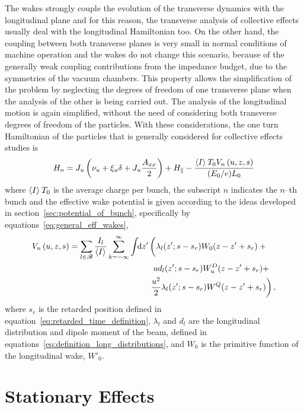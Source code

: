     The wakes strongly couple the evolution of the transverse dynamics with the longitudinal plane and for this reason, the transverse analysis of collective effects usually deal with the longitudinal Hamiltonian too. On the other hand, the coupling between both transverse planes is very small in normal conditions of machine operation and the wakes do not change this scenario, because of the generally weak coupling contributions from the impedance budget, due to the symmetries of the vacuum chambers. This property allows the simplification of the problem by neglecting the degrees of freedom of one transverse plane when the analysis of the other is being carried out. The analysis of the longitudinal motion is again simplified, without the need of considering both transverse degrees of freedom of the particles. With these considerations, the one turn Hamiltonian of the particles that is generally considered for collective effects studies is
    \begin{align}\label{eq:current_depend_hamiltonian}
        H_n = J_u\left(\nu_u + \xi_u\delta + J_u\frac{A_{xx}}{2}\right) +
                H_{\parallel} - \frac{\left\langle I \right\rangle_{{}}T_0V_n\left(u, z, s\right)}{(E_0/e)L_0}
    \end{align}
    where $\left\langle I \right\rangle_{{}}T_0$ is the average charge per bunch, the subscript $n$ indicates the $n$--th bunch and the effective wake potential is given according to the ideas developed in section~\ref{sec:potential_of_bunch}, specifically by equations~\eqref{eq:general_eff_wakes},
    \begin{align}\label{eq:generalwake}
        V_n\fof{u, z, s} =\nonumber \sum_{l\in\mathscr{B}}\frac{I_l}{\average{I}}\sum_{k=-\infty}^\infty\udefint{z'}{
        &\left(\lambda_l(z'; s - s_r) W_0(z-z' + s_r) + \vphantom{\frac{u^2}{2}}\right.\\\nonumber
        &\hphantom{u}ud_l(z'; s -s_r) W^D_u(z-z' + s_r) +\\
        &\left. \frac{u^2}{2}\lambda_l(z'; s - s_r) W^Q(z-z' + s_r)\right)},
    \end{align}
    where $s_r$ is the retarded position defined in equation~\eqref{eq:retarded_time_definition}, $\lambda_l$ and $d_l$ are the longitudinal distribution and dipole moment of the beam, defined in equations~\eqref{eq:definition_long_distributions}, and $W_0$ is the primitive function of the longitudinal wake, $W'_0$.

\section{Stationary Effects}

